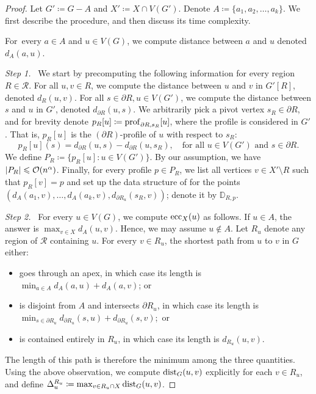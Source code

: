 \begin{proof}
    Let $G' \coloneqq G - A$ and $X' \coloneqq X \cap V(G')$.    Denote $A \coloneqq \{a_1,a_2,\ldots,a_k\}$. We first describe the procedure, and then discuss its time complexity.

    For~every $a \in A$ and $u \in V(G)$, we compute distance between $a$ and $u$ denoted $d_A(a, u)$.
    
    \medskip
    \emph{Step 1.} \ 
    We start by precomputing the following information for every region $R\in \mathcal{R}$.
    For all $u, v \in R$, we compute the distance between $u$ and $v$ in $G'[R]$, denoted $d_R(u, v)$.
    For all $s \in \partial R, u \in V(G')$, we compute the distance between $s$ and $u$ in $G'$, denoted $d_{\partial R}(u,s)$.
    We arbitrarily pick a pivot vertex $s_R \in \partial R$, and for brevity denote $p_R[u] \coloneqq \mathrm{prof}_{\partial R,s_R}[u]$, where the profile is considered in $G'$. That is, $p_R[u]$ is the $(\partial R)$-profile of $u$ with respect to $s_R$:
    $$p_R[u](s) = d_{\partial R}(u, s) - d_{\partial R}(u, s_R),\quad \textrm{for all }u \in V(G')\textrm{ and } s \in \partial R.$$
    We define $P_R \coloneqq \{ p_R[u] \colon u \in V(G')\}$. By our assumption, we have $|P_R| \leqslant \mathcal{O}(n^\alpha)$. Finally, for every profile $p \in P_R$, we list all vertices $v \in X' \setminus R$ such that $p_R[v] = p$ and set up the data structure of  for the points $(d_A(a_1, v), \dots, d_A(a_k, v), d_{\partial R_u}(s_R, v))$; denote it by $\mathbb{D}_{R, p}$.
    
    \medskip
    \emph{Step 2.} \ 
    For every $u \in V(G)$, we compute $\mathrm{ecc}_X(u)$ as follows. If $u \in A$, the answer is $\max_{v \in X} d_A(u, v)$. Hence, we may assume $u \not\in A$.
    Let $R_u$ denote any region of $\mathcal{R}$ containing $u$. For every $v \in R_u$, the shortest path from $u$ to $v$ in $G$ either:
    \begin{itemize}[nosep]
        \item goes through an apex, in which case its length is $\min_{a \in A} d_A(a, u) + d_A(a, v)$; or
        \item is disjoint from $A$ and intersects $\partial R_u$, in which case its length is $\min_{s \in \partial R_u} d_{\partial R_u}(s, u) + d_{\partial R_u}(s, v)$;~or
        \item is contained entirely in $R_u$, in which case its length is $d_{R_u}(u, v)$.
    \end{itemize}
    The length of this path is therefore the minimum among the three quantities.
    Using the above observation, we compute $\mathrm{dist}_G(u, v)$ explicitly for each $v \in R_u$, and define $\Delta^{R_u}_u \coloneqq \max_{v \in R_u \cap X} \mathrm{dist}_G(u, v)$.
    

\end{proof}
